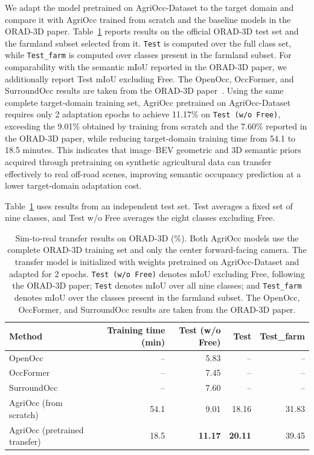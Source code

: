 \documentclass[a4paper,fleqn]{cas-sc}
\begin{document}
We adapt the model pretrained on AgriOcc-Dataset to the target domain and compare it with AgriOcc trained from scratch and the baseline models in the ORAD-3D paper.
Table~\ref{tab:orad} reports results on the official ORAD-3D test set and the farmland subset selected from it.
\texttt{Test} is computed over the full class set, while \texttt{Test\_farm} is computed over classes present in the farmland subset.
For comparability with the semantic mIoU reported in the ORAD-3D paper, we additionally report Test mIoU excluding Free. The OpenOcc, OccFormer, and SurroundOcc results are taken from the ORAD-3D paper~\citep{chen2025orad3d}.
Using the same complete target-domain training set, AgriOcc pretrained on AgriOcc-Dataset requires only 2 adaptation epochs to achieve 11.17\% on \texttt{Test (w/o Free)}, exceeding the 9.01\% obtained by training from scratch and the 7.60\% reported in the ORAD-3D paper, while reducing target-domain training time from 54.1 to 18.5 minutes.
This indicates that image--BEV geometric and 3D semantic priors acquired through pretraining on synthetic agricultural data can transfer effectively to real off-road scenes, improving semantic occupancy prediction at a lower target-domain adaptation cost.

Table~\ref{tab:orad} uses results from an independent test set.
Test averages a fixed set of nine classes, and Test w/o Free averages the eight classes excluding Free.

\begin{table}[pos=htbp]
\centering
\caption{Sim-to-real transfer results on ORAD-3D (\%). Both AgriOcc models use the complete ORAD-3D training set and only the center forward-facing camera. The transfer model is initialized with weights pretrained on AgriOcc-Dataset and adapted for 2 epochs.
\texttt{Test (w/o Free)} denotes mIoU excluding Free, following the ORAD-3D paper; \texttt{Test} denotes mIoU over all nine classes; and \texttt{Test\_farm} denotes mIoU over the classes present in the farmland subset.
The OpenOcc, OccFormer, and SurroundOcc results are taken from the ORAD-3D paper.}

\label{tab:orad}
\fontsize{9}{11}\selectfont
\setlength{\tabcolsep}{2.6pt}
\begin{tabular}{lrrrr}
\toprule 
Method & Training time (min) & Test (w/o Free) & Test & Test\_farm \\
\midrule
OpenOcc~\citep{jiang2024openocc} & -- & 5.83 & -- & -- \\
OccFormer~\citep{zhang2023occformer} & -- & 7.45 & -- & -- \\
SurroundOcc~\citep{wei2023surroundocc} & -- & 7.60 & -- & -- \\
\midrule
AgriOcc (from scratch) & 54.1 & 9.01 & 18.16 & 31.83 \\
\midrule
AgriOcc (pretrained transfer) & 18.5 & \textbf{11.17} & \textbf{20.11} & 39.45 \\
\bottomrule
\end{tabular}
\end{table}
\end{document}
